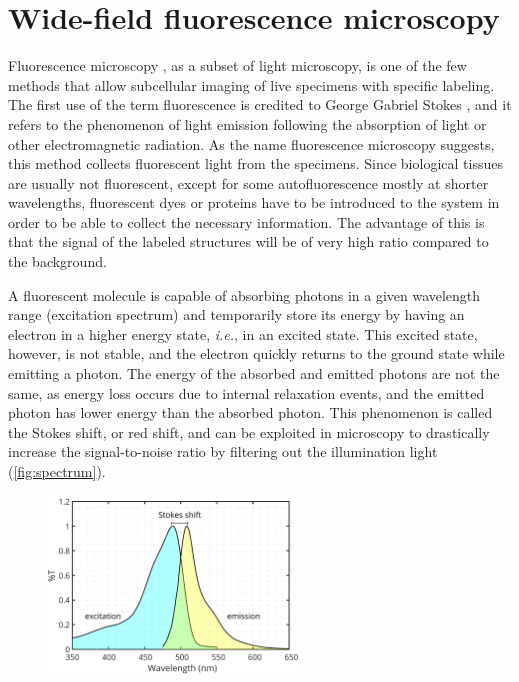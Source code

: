\section{Wide-field fluorescence microscopy}

Fluorescence microscopy \cite{lichtman_fluorescence_2005,diaspro_optical_2011}, as a subset of light microscopy, is one of the few methods that allow subcellular imaging of live specimens with specific labeling.
The first use of the term fluorescence is credited to  George Gabriel Stokes \cite{stokes_change_1852}, and it refers to the phenomenon of light emission following the absorption of light or other electromagnetic radiation. As the name fluorescence microscopy suggests, this method collects fluorescent light from the specimens.
Since biological tissues are usually not fluorescent, except for some autofluorescence mostly at shorter wavelengths, fluorescent dyes or proteins have to be introduced to the system in order to be able to collect the necessary information. The advantage of this is that the signal of the labeled structures will be of very high ratio compared to the background.

A fluorescent molecule is capable of absorbing photons in a given wavelength range (excitation spectrum) and temporarily store its energy by having an electron in a higher energy state, \textit{i.e.}, in an excited state. This excited state, however, is not stable, and the electron quickly returns to the ground state while emitting a photon. The energy of the absorbed and emitted photons are not the same, as energy loss occurs due to internal relaxation events, and the emitted photon has lower energy than the absorbed photon. This phenomenon is called the Stokes shift, or red shift, and can be exploited in microscopy to drastically increase the signal-to-noise ratio by filtering out the illumination light (\autoref{fig:spectrum}).

  \begin{figure}
    \centering
    \includegraphics[width=0.6\textwidth]{spectrum/egfp}
    \label{fig:spectrum}
  \end{figure}

